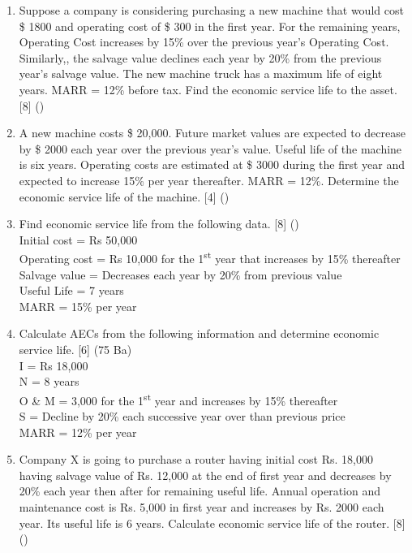 \documentclass[12pt]{article}
\newcommand{\super}[1]{\textsuperscript{#1}}
\begin{document}
\begin{enumerate}
			\item Suppose a company is considering purchasing a new machine that would cost \$ 1800 and operating cost of \$ 300 in the first year. For the remaining years, Operating Cost increases by 15\% over the previous year's Operating Cost. Similarly,, the salvage value declines each year by 20\% from the previous year's salvage value. The new machine truck has a maximum life of eight years. MARR = 12\% before tax. Find the economic service life to the asset. \hfill [8] ()

			\item A new machine costs \$ 20,000. Future market values are expected to decrease by \$ 2000 each year over the previous year's value. Useful life of the machine is six years. Operating costs are estimated at \$ 3000 during the first year and expected to increase 15\% per year thereafter. MARR = 12\%. Determine the economic service life of the machine. \hfill [4] ()

			\item Find economic service life from the following data. \hfill [8] ()\\
			Initial cost = Rs 50,000 \\
			Operating cost = Rs 10,000 for the 1\super{st} year that increases by 15\% thereafter \\
			Salvage value = Decreases each year by 20\% from previous value \\
			Useful Life = 7 years \\
			MARR = 15\% per year

			\item Calculate AECs from the following information and determine economic service life. \hfill [6] (75 Ba)\\
			I = Rs 18,000 \\
			N = 8 years \\
			O \& M = 3,000 for the 1\super{st} year and increases by 15\% thereafter \\
			S = Decline by 20\% each successive year over than previous price \\
			MARR = 12\% per year

			\item Company X is going to purchase a router having initial cost Rs. 18,000 having salvage value of Rs. 12,000 at the end of first year and decreases by 20\% each year then after for remaining useful life. Annual operation and maintenance cost is Rs. 5,000 in first year and increases by Rs. 2000 each year. Its useful life is 6 years. Calculate economic service life of the router. \hfill [8] ()


\end{enumerate}
\end{document}
